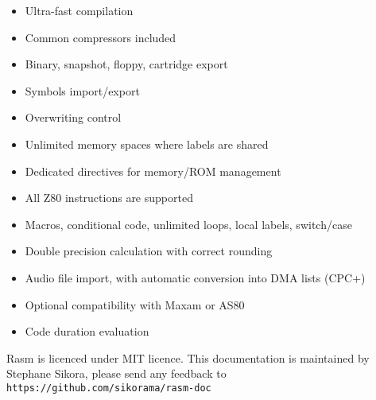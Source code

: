 \begin{xen}
\begin{itemize}[noitemsep]
\item Ultra-fast compilation
\item Common compressors included
\item Binary, snapshot, floppy, cartridge export
\item Symbols import/export
\item Overwriting control
\item Unlimited memory spaces where labels are shared
\item Dedicated directives for memory/ROM management
\item All Z80 instructions are supported
\item Macros, conditional code, unlimited loops, local labels, switch/case
\item Double precision calculation with correct rounding
\item Audio file import, with automatic conversion into DMA lists (CPC+)
\item Optional compatibility with Maxam or AS80
\item Code duration evaluation
\end{itemize}

Rasm is licenced under MIT licence. 
\medskip
This documentation is maintained by Stephane Sikora, please send any feedback to \texttt{https://github.com/sikorama/rasm-doc}

\end{xen}

